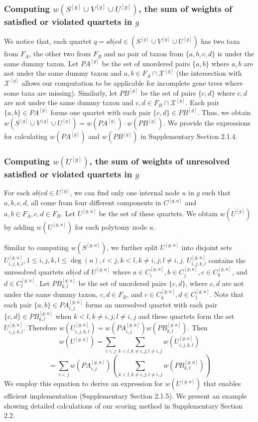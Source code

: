\documentclass[11pt]{article}
\begin{document}
\subsubsection*{Computing $w(S^{[g]} \cup V^{[g]} \cup U^{[g]})$, the sum of weights of satisfied or violated quartets in $g$}

We notice that, each quartet $q = ab|cd \in (S^{[g]} \cup V^{[g]} \cup U^{[g]})$ has two taxa from $F_A$, the other two from $F_B$ and no pair of taxon from $\{a, b, c, d\}$ is under the same dummy taxon. Let $PA^{[g]}$ be the set of unordered pairs $\{a, b\}$ where $a, b$ are not under the same dummy taxon and $a, b \in F_A \cap \mathcal{X}^{[g]}$ (the intersection with $\mathcal{X}^{[g]}$ allows our computation to be applicable for incomplete gene trees where some taxa are missing). Similarly, let $PB^{[g]}$ be the set of pairs $\{c, d\}$ where $c, d$ are not under the same dummy taxon and $c, d \in F_B \cap \mathcal{X}^{[g]}$. Each pair $\{a, b\} \in PA^{[g]}$ forms one quartet with each pair $\{c, d\} \in PB^{[g]}$. Thus, we obtain $w(S^{[g]} \cup V^{[g]} \cup U^{[g]}) = w(PA^{[g]}) \cdot w(PB^{[g]})$. We provide the expressions for calculating $w(PA^{[g]})$ and $w(PB^{[g]})$ in Supplementary Section 2.1.4.

\subsubsection*{Computing $w(U^{[g]})$, the sum of weights of unresolved satisfied or violated quartets in $g$}

For each $ab|cd \in U^{[g]}$, we can find only one internal node $u$ in $g$ such that $a, b, c, d$, all come from four different components in $C^{[g,u]}$ and $a, b \in F_A, c, d \in F_B$. Let $U^{[g,u]}$ be the set of these quartets. We obtain $w(U^{[g]})$ by adding $w(U^{[g,u]})$ for each polytomy node $u$.

Similar to computing $w(S^{[g,u]})$, we further split $U^{[g,u]}$ into disjoint sets $U_{i,j,k,l}^{[g,u]}, 1 \leq i, j, k, l \leq \deg(u), i < j, k < l, k \neq i, j; l \neq i, j$. $U_{i,j,k,l}^{[g,u]}$ contains the unresolved quartets $ab|cd$ of $U^{[g,u]}$ where $a \in C_i^{[g,u]}, b \in C_j^{[g,u]}, c \in C_k^{[g,u]}$, and $d \in C_l^{[g,u]}$. Let $PB_{k,l}^{[g,u]}$ be the set of unordered pairs $\{c, d\}$, where $c, d$ are not under the same dummy taxon, $c, d \in F_B$, and $c \in C_k^{[g,u]}, d \in C_l^{[g,u]}$. Note that each pair $\{a, b\} \in PA_{i,j}^{[g,u]}$ forms an unresolved quartet with each pair $\{c, d\} \in PB_{k,l}^{[g,u]}$ when $k < l, k \neq i, j; l \neq i, j$ and these quartets form the set $U_{i,j,k,l}^{[g,u]}$. Therefore $w(U_{i,j,k,l}^{[g,u]}) = w(PA_{i,j}^{[g,u]}) w(PB_{k,l}^{[g,u]})$. Then
\[
w(U^{[g,u]}) = \sum_{i < j} \sum_{k < l, k \neq i, j; l \neq i, j} w(U_{i,j,k,l}^{[g,u]})
\]
\[
= \sum_{i < j} w(PA_{i,j}^{[g,u]}) \left( \sum_{k < l, k \neq i, j; l \neq i, j} w(PB_{k,l}^{[g,u]}) \right)
\]
We employ this equation to derive an expression for $w(U^{[g,u]})$ that enables efficient implementation (Supplementary Section 2.1.5). We present an example showing detailed calculations of our scoring method in Supplementary Section 2.2.
\end{document}
